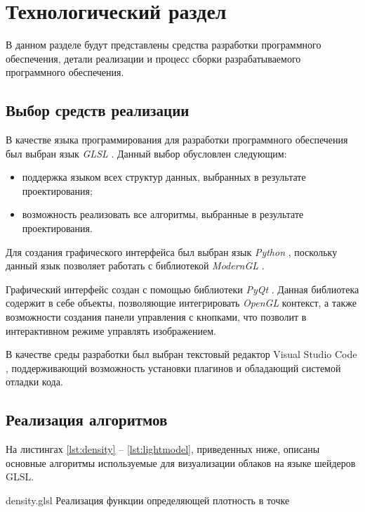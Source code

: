 \chapter{Технологический раздел}

В данном разделе будут представлены средства разработки программного обеспечения, детали реализации и процесс сборки разрабатываемого
программного обеспечения.

\section{Выбор средств реализации}

В качестве языка программирования для разработки программного обеспечения был выбран язык \textit{GLSL} \cite{glsl}. Данный выбор обусловлен следующим:
\begin{itemize}
	\item поддержка языком всех структур данных, выбранных в результате проектирования;
	\item возможность реализовать все алгоритмы, выбранные в результате проектирования.
\end{itemize}


Для создания графического интерфейса был выбран язык \textit{Python} \cite{python}, поскольку данный язык позволяет работать с библиотекой \textit{ModernGL} \cite{moderngl}.
 
Графический интерфейс создан с помощью библиотеки \textit{PyQt} \cite{pyqt}. Данная библиотека содержит в себе объекты, позволяющие интегрировать \textit{OpenGL} контекст, а также возможности создания панели управления с кнопками, что позволит в интерактивном режиме управлять изображением.

В качестве среды разработки был выбран текстовый редактор Visual Studio Code \cite{vsc}, поддерживающий возможность установки плагинов и обладающий системой отладки кода.


\section{Реализация алгоритмов}

На листингах \ref{lst:density} -- \ref{lst:lightmodel}, приведенных ниже, описаны основные алгоритмы используемые для визуализации облаков на языке шейдеров GLSL.



\clearpage

{density.glsl} %
{} %
{Реализация функции определяющей плотность в точке} %


